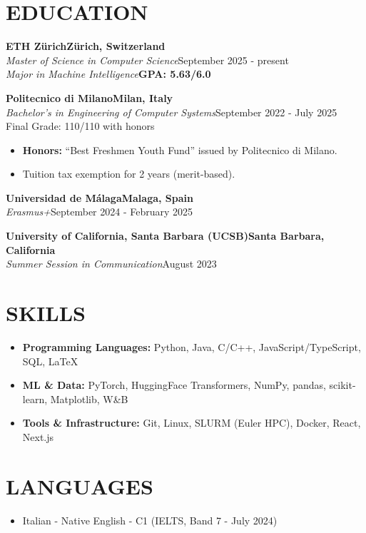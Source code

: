 \documentclass[11pt,a4paper]{article}
\begin{document}
\section{EDUCATION}

\noindent\textbf{ETH Zürich}\hfill\textbf{Zürich, Switzerland}\\[-2pt]
\textit{Master of Science in Computer Science}\hfill September 2025 - present\\[-2pt]
\textit{Major in Machine Intelligence}\hfill \textbf{GPA: 5.63/6.0}

\vspace{2pt}
\noindent\textbf{Politecnico di Milano}\hfill\textbf{Milan, Italy}\\[-2pt]
\textit{Bachelor's in Engineering of Computer Systems}\hfill September 2022 -  July 2025\\[-2pt]
\hfill Final Grade: 110/110 with honors
\begin{itemize}
  \item \textbf{Honors:} ``Best Freshmen Youth Fund'' issued by Politecnico di Milano.
  \item Tuition tax exemption for 2 years (merit-based).
\end{itemize}

\vspace{2pt}
\noindent\textbf{Universidad de Málaga}\hfill\textbf{Malaga, Spain}\\[-2pt]
\textit{Erasmus+}\hfill September 2024 - February 2025

\vspace{2pt}
\noindent\textbf{University of California, Santa Barbara (UCSB)}\hfill\textbf{Santa Barbara, California}\\[-2pt]
\textit{Summer Session in Communication}\hfill August 2023

\section{SKILLS}

\begin{itemize}
  \item \textbf{Programming Languages:} Python, Java, C/C++, JavaScript/TypeScript, SQL, LaTeX
  \item \textbf{ML \& Data:} PyTorch, HuggingFace Transformers, NumPy, pandas, scikit-learn, Matplotlib, W\&B
  \item \textbf{Tools \& Infrastructure:} Git, Linux, SLURM (Euler HPC), Docker, React, Next.js
\end{itemize}

\section{LANGUAGES}

\begin{itemize}
  \item Italian - Native \textbar{} English - C1 (IELTS, Band 7 - July 2024)
\end{itemize}
\end{document}
